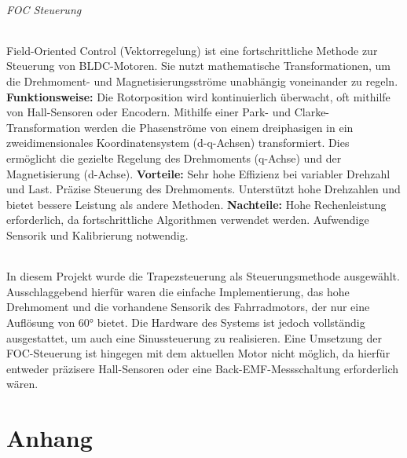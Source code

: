 \documentclass[paper=a4,11pt]{scrreprt}
\begin{document}
\paragraph{FOC Steuerung} Field-Oriented Control (Vektorregelung) ist eine fortschrittliche Methode zur Steuerung von BLDC-Motoren. Sie nutzt mathematische Transformationen, um die Drehmoment- und Magnetisierungsströme unabhängig voneinander zu regeln. \textbf{Funktionsweise:} Die Rotorposition wird kontinuierlich überwacht, oft mithilfe von Hall-Sensoren oder Encodern. Mithilfe einer Park- und Clarke-Transformation werden die Phasenströme von einem dreiphasigen in ein zweidimensionales Koordinatensystem (d-q-Achsen) transformiert. Dies ermöglicht die gezielte Regelung des Drehmoments (q-Achse) und der Magnetisierung (d-Achse). \textbf{Vorteile:} Sehr hohe Effizienz bei variabler Drehzahl und Last. Präzise Steuerung des Drehmoments. Unterstützt hohe Drehzahlen und bietet bessere Leistung als andere Methoden. \textbf{Nachteile:} Hohe Rechenleistung erforderlich, da fortschrittliche Algorithmen verwendet werden. Aufwendige Sensorik und Kalibrierung notwendig.
\paragraph{}In diesem Projekt wurde die Trapezsteuerung als Steuerungsmethode ausgewählt. Ausschlaggebend hierfür waren die einfache Implementierung, das hohe Drehmoment und die vorhandene Sensorik des Fahrradmotors, der nur eine Auflösung von 60° bietet. Die Hardware des Systems ist jedoch vollständig ausgestattet, um auch eine Sinussteuerung zu realisieren. Eine Umsetzung der FOC-Steuerung ist hingegen mit dem aktuellen Motor nicht möglich, da hierfür entweder präzisere Hall-Sensoren oder eine Back-EMF-Messschaltung erforderlich wären.
\part{Anhang}
\end{document}

